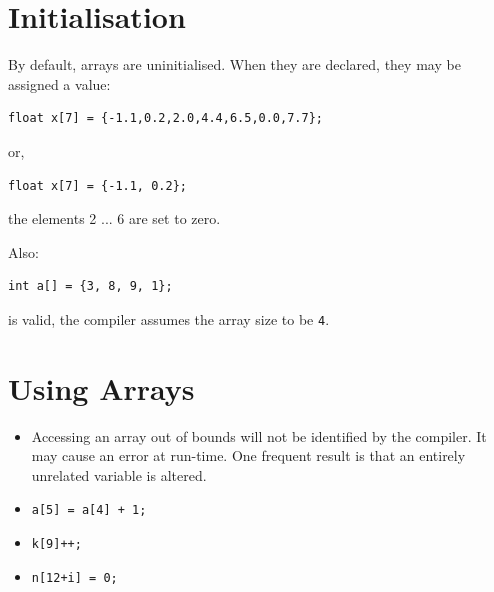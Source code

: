 \documentclass[a4,portraitt]{slides}
\begin{document}
\section{Initialisation}
By default, arrays are uninitialised.
When they are declared, they may be assigned a value:
{\small
\begin{verbatim}
float x[7] = {-1.1,0.2,2.0,4.4,6.5,0.0,7.7};
\end{verbatim}
}
or,
{\small
\begin{verbatim}
float x[7] = {-1.1, 0.2};
\end{verbatim}
}
the elements 2 ... 6 are set to zero.

Also:
{\small
\begin{verbatim}
int a[] = {3, 8, 9, 1};
\end{verbatim}
}
is valid, the compiler assumes the array size to be \verb^4^.


\newpage
\section*{Using Arrays}
\begin{itemize}
\item Accessing an array out of bounds will not be identified by
the compiler. It may cause an error at run-time.
One frequent result is that an entirely unrelated variable
is altered.
\item \verb^a[5] = a[4] + 1;^
\item \verb^k[9]++;^
\item \verb^n[12+i] = 0;^
\end{itemize}
\end{document}
